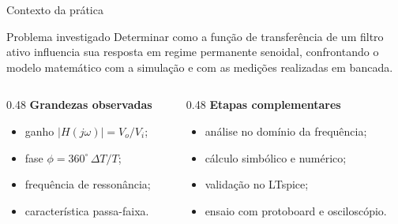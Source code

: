 \begin{frame}{Contexto da prática}
  \begin{block}{Problema investigado}
    Determinar como a função de transferência de um filtro ativo influencia sua
    resposta em regime permanente senoidal, confrontando o modelo matemático com
    a simulação e com as medições realizadas em bancada.
  \end{block}

  \begin{columns}[T,onlytextwidth]
    \begin{column}{0.48\textwidth}
      \textbf{Grandezas observadas}
      \begin{itemize}
        \item ganho $|H(j\omega)|=V_o/V_i$;
        \item fase $\phi=360^{\circ}\,\Delta T/T$;
        \item frequência de ressonância;
        \item característica passa-faixa.
      \end{itemize}
    \end{column}
    \begin{column}{0.48\textwidth}
      \textbf{Etapas complementares}
      \begin{itemize}
        \item análise no domínio da frequência;
        \item cálculo simbólico e numérico;
        \item validação no LTspice;
        \item ensaio com protoboard e osciloscópio.
      \end{itemize}
    \end{column}
  \end{columns}
\end{frame}